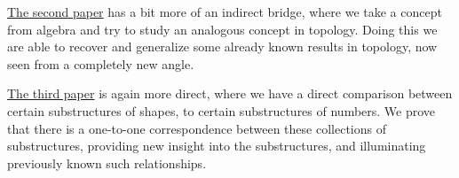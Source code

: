 {\hyperref[ch2]{The second paper}} has a bit more of an indirect bridge, where we take a concept from algebra and try to study an analogous concept in topology. Doing this we are able to recover and generalize some already known results in topology, now seen from a completely new angle. 

{\hyperref[ch3]{The third paper}} is again more direct, where we have a direct comparison between certain substructures of shapes, to certain substructures of numbers. We prove that there is a one-to-one correspondence between these collections of substructures, providing new insight into the substructures, and illuminating previously known such relationships. 
